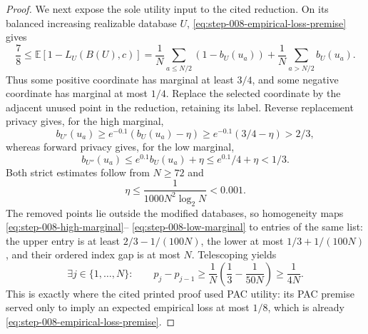\begin{proof}
We next expose the sole utility input to the cited reduction.  On its
balanced increasing realizable database \(U\),
\eqref{eq:step-008-empirical-loss-premise} gives
\begin{equation}\label{eq:step-008-balanced-accuracy}
\frac78
\le\mathbb E[1-L_U(B(U),c)]
=\frac1N\sum_{a\le N/2}(1-b_U(u_a))
 +\frac1N\sum_{a>N/2}b_U(u_a).
\end{equation}
Thus some positive coordinate has marginal at least \(3/4\), and some
negative coordinate has marginal at most \(1/4\).  Replace the selected
coordinate by the adjacent unused point in the reduction, retaining its
label.  Reverse replacement privacy gives, for the high marginal,
\begin{equation}\label{eq:step-008-high-marginal}
b_{U'}(u_a)
\ge e^{-0.1}(b_U(u_a)-\eta)
\ge e^{-0.1}(3/4-\eta)>2/3,
\end{equation}
whereas forward privacy gives, for the low marginal,
\begin{equation}\label{eq:step-008-low-marginal}
b_{U''}(u_a)
\le e^{0.1}b_U(u_a)+\eta
\le e^{0.1}/4+\eta<1/3.
\end{equation}
Both strict estimates follow from \(N\ge72\) and
\begin{equation}\label{eq:step-008-small-eta}
\eta\le\frac1{1000N^2\log_2N}<0.001.
\end{equation}
The removed points lie outside the modified databases, so homogeneity maps
\eqref{eq:step-008-high-marginal}--
\eqref{eq:step-008-low-marginal} to entries of the same list: the upper
entry is at least \(2/3-1/(100N)\), the lower at most
\(1/3+1/(100N)\), and their ordered index gap is at most \(N\).
Telescoping yields
\begin{equation}\label{eq:step-008-probability-jump}
\exists j\in\{1,\ldots,N\}:\qquad
p_j-p_{j-1}\ge
\frac1N\left(\frac13-\frac1{50N}\right)
\ge\frac1{4N}.
\end{equation}
This is exactly where the cited printed proof used PAC utility: its PAC
premise served only to imply an expected empirical loss at most \(1/8\),
which is already \eqref{eq:step-008-empirical-loss-premise}.


\end{proof}
